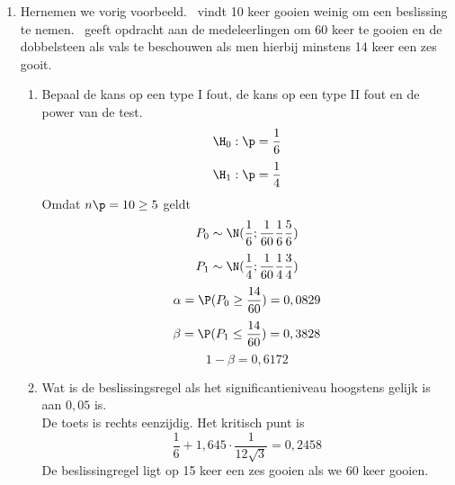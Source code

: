 {\begin{enumerate}
\begin{enumerate}
\end{enumerate}
\item Hernemen we vorig voorbeeld. \leerlv\ vindt 10 keer gooien weinig om een beslissing te nemen.  \leerlv\ geeft opdracht aan de medeleerlingen om 60 keer te gooien en de dobbelsteen als vals te beschouwen als men hierbij minstens 14 keer een zes gooit. 
\begin{enumerate}
\item Bepaal de kans op een type I fout, de kans op een type II fout en de power van de test.
$$\H_0:\p=\frac{1}{6}$$
$$\H_1:\p=\frac{1}{4}$$
 Omdat $n\p=10\geq 5$ geldt
$$P_0\sim \N(\frac{1}{6};\frac{1}{60}\frac{1}{6}\frac{5}{6}) $$
 $$P_1\sim \N(\frac{1}{4};\frac{1}{60}\frac{1}{4}\frac{3}{4}) $$
$$\alpha=\P(P_0\geq \frac{14}{60})=0,0829$$
$$\beta=\P(P_1\leq \frac{14}{60})=0,3828$$
$$1-\beta=0,6172$$
\item Wat is de beslissingsregel  als het significantieniveau hoogstens gelijk is aan $0,05$ is.\\
De toets is rechts eenzijdig. Het kritisch punt is
$$\frac{1}{6}+1,645\cdot \frac{1}{12\sqrt{3}}=0,2458$$
De beslissingregel ligt op 15 keer een zes gooien als we 60 keer gooien. 
\end{enumerate}




%
\end{enumerate}

}
